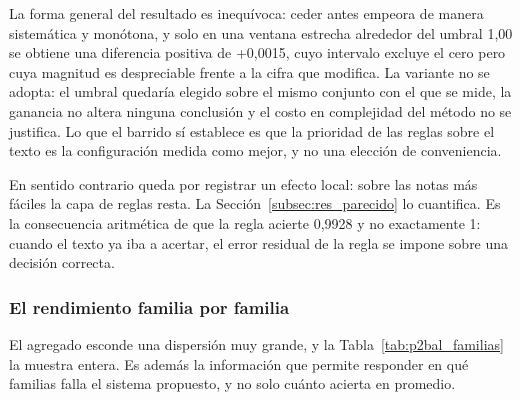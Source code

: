 La forma general del resultado es inequívoca: ceder antes empeora de manera sistemática y monótona, y solo en una ventana estrecha alrededor del umbral 1,00 se obtiene una diferencia positiva de +0,0015, cuyo intervalo excluye el cero pero cuya magnitud es despreciable frente a la cifra que modifica. La variante no se adopta: el umbral quedaría elegido sobre el mismo conjunto con el que se mide, la ganancia no altera ninguna conclusión y el costo en complejidad del método no se justifica. Lo que el barrido sí establece es que la prioridad de las reglas sobre el texto es la configuración medida como mejor, y no una elección de conveniencia.

En sentido contrario queda por registrar un efecto local: sobre las notas más fáciles la capa de reglas resta. La Sección~\ref{subsec:res_parecido} lo cuantifica. Es la consecuencia aritmética de que la regla acierte 0,9928 y no exactamente 1: cuando el texto ya iba a acertar, el error residual de la regla se impone sobre una decisión correcta.

\subsubsection*{El rendimiento familia por familia}

El agregado esconde una dispersión muy grande, y la Tabla~\ref{tab:p2bal_familias} la muestra entera. Es además la información que permite responder en qué familias falla el sistema propuesto, y no solo cuánto acierta en promedio.

